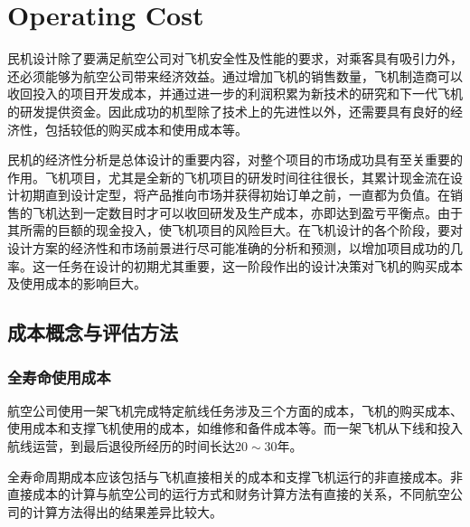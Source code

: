 \chapter{Operating Cost}\label{ch-doc}
民机设计除了要满足航空公司对飞机安全性及性能的要求，对乘客具有吸引力外，还必须能够为航空公司带来经济效益。通过增加飞机的销售数量，飞机制造商可以收回投入的项目开发成本，并通过进一步的利润积累为新技术的研究和下一代飞机的研发提供资金。因此成功的机型除了技术上的先进性以外，还需要具有良好的经济性，包括较低的购买成本和使用成本等。

民机的经济性分析是总体设计的重要内容，对整个项目的市场成功具有至关重要的作用。飞机项目，尤其是全新的飞机项目的研发时间往往很长，其累计现金流在设计初期直到设计定型，将产品推向市场并获得初始订单之前，一直都为负值。在销售的飞机达到一定数目时才可以收回研发及生产成本，亦即达到盈亏平衡点。由于其所需的巨额的现金投入，使飞机项目的风险巨大。在飞机设计的各个阶段，要对设计方案的经济性和市场前景进行尽可能准确的分析和预测，以增加项目成功的几率。这一任务在设计的初期尤其重要，这一阶段作出的设计决策对飞机的购买成本及使用成本的影响巨大。

\section{成本概念与评估方法}\label{c13.1}

\subsection{全寿命使用成本}\label{c13.1.1}
航空公司使用一架飞机完成特定航线任务涉及三个方面的成本，飞机的购买成本、使用成本和支撑飞机使用的成本，如维修和备件成本等。而一架飞机从下线和投入航线运营，到最后退役所经历的时间长达$20\sim30$年。

全寿命周期成本应该包括与飞机直接相关的成本和支撑飞机运行的非直接成本。非直接成本的计算与航空公司的运行方式和财务计算方法有直接的关系，不同航空公司的计算方法得出的结果差异比较大。

